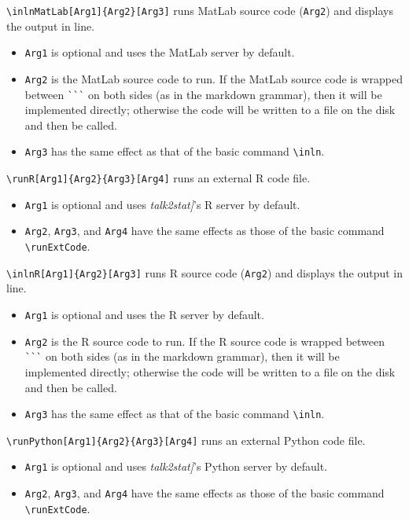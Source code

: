 \documentclass{ltxdoc}
\begin{document}
\noindent 
\verb|\inlnMatLab[Arg1]{Arg2}[Arg3]| runs MatLab source code (\texttt{Arg2}) and displays the output in line.
\begin{itemize}
\item \texttt{Arg1} is optional and uses the MatLab server by default.
\item \texttt{Arg2} is the MatLab source code to run. If the MatLab source code is wrapped between \verb|```| on both sides (as in the markdown grammar), then it will be implemented directly; otherwise the code will be written to a file on the disk and then be called.
\item \texttt{Arg3} has the same effect as that of the basic command \verb|\inln|.
\end{itemize}


\bigskip
\noindent \verb|\runR[Arg1]{Arg2}{Arg3}[Arg4]| runs an external R code file.
\begin{itemize}
\item \texttt{Arg1} is optional and uses \textit{talk2stat]}'s R server by default.
\item \texttt{Arg2}, \texttt{Arg3}, and \texttt{Arg4} have the same effects as those of the basic command \verb|\runExtCode|. 
\end{itemize}

\noindent \verb|\inlnR[Arg1]{Arg2}[Arg3]| runs R source code (\texttt{Arg2}) and displays the output in line.
\begin{itemize}
\item \texttt{Arg1} is optional and uses the R server by default.
\item \texttt{Arg2} is the R source code to run. If the R  source code is wrapped between \verb|```| on both sides (as in the markdown grammar), then it will be implemented directly; otherwise the code will be written to a file on the disk and then be called.
\item \texttt{Arg3} has the same effect as that of the basic command  \verb|\inln|.
\end{itemize}


\bigskip
\noindent \verb|\runPython[Arg1]{Arg2}{Arg3}[Arg4]| runs an external Python code file.
\begin{itemize}
\item \texttt{Arg1} is optional and uses \textit{talk2stat]}'s Python server by default.
\item \texttt{Arg2}, \texttt{Arg3}, and \texttt{Arg4} have the same effects as those of the basic command \verb|\runExtCode|. 
\end{itemize}
\end{document}
